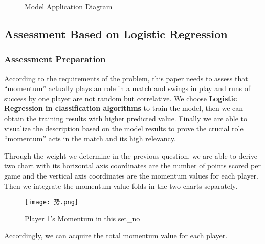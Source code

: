 \documentclass{mcmthesis}
\begin{document}
\begin{figure}[htbp]
    \centering
    \vspace{-0.15in}
    
    \begin{minipage}{1\linewidth}
        \hfill %
    \end{minipage}
    
    \vskip -0.3cm
    
    \begin{minipage}{1\linewidth}
        \hfill %
    \end{minipage}
    
    \vspace{-0.18in}
    
    \caption{Model Application Diagram} \label{fig:8-11}
\end{figure}
\subsection{Assessment Based on Logistic Regression}

\subsubsection{Assessment Preparation}
According to the requirements of the problem, this paper needs to assess that “momentum”
actually plays an role in a match and swings in play and runs of success by one player are not
random but correlative. We choose {\bf Logistic Regression in classification algorithms} to train the
model, then we can obtain the training results with higher predicted value. Finally we are able to
visualize the description based on the model results to prove the crucial role “momentum” acts in
the match and its high relevancy.

Through the weight we determine in the previous question, we are able to derive two chart
with its horizontal axis coordinates are the number of points scored per game and the vertical axis
coordinates are the momentum values for each player. Then we integrate the momentum value
folds in the two charts separately.
\begin{figure}[H]
    \centering
    \texttt{[image: 势.png]}
    \caption{Player 1's Momentum in this set\_no} \label{Figure 12}
\end{figure}
Accordingly, we can acquire the total momentum value for each player. 
\end{document}
